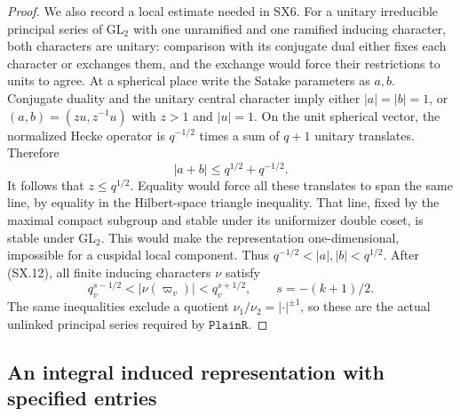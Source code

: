 \begin{proof}
We also record a local estimate needed in SX6.  For a unitary
irreducible principal series of $\mathrm{GL}_2$ with one
unramified and one ramified inducing character, both characters
are unitary: comparison with its conjugate dual either fixes
each character or exchanges them, and the exchange would force
their restrictions to units to agree.  At a spherical place write
the Satake parameters as $a,b$.  Conjugate duality and the unitary
central character imply either $|a|=|b|=1$, or
$(a,b)=(zu,z^{-1}u)$ with $z>1$ and $|u|=1$.
On the unit spherical vector, the normalized Hecke operator is
$q^{-1/2}$ times a sum of $q+1$ unitary translates.  Therefore
\[
                   |a+b|\le q^{1/2}+q^{-1/2}.
\]
It follows that $z\le q^{1/2}$.  Equality would force all these
translates to span the same line, by equality in the Hilbert-space
triangle inequality.  That line, fixed by the maximal compact
subgroup and stable under its uniformizer double coset, is stable
under $\mathrm{GL}_2$.  This would make the representation
one-dimensional, impossible for a cuspidal local component.
Thus $q^{-1/2}<|a|,|b|<q^{1/2}$.
After (SX.12), all finite inducing characters $\nu$ satisfy
\[
 q_v^{s-1/2}<|\nu(\varpi_v)|<q_v^{s+1/2},
                  \qquad s=-(k+1)/2.               \tag{SX.13}
\]
The same inequalities exclude a quotient $\nu_1/\nu_2=|\cdot|^{\pm1}$,
so these are the actual unlinked principal series required by
$\texttt{PlainR}$.
\end{proof}

\subsection{An integral induced representation with specified entries}

